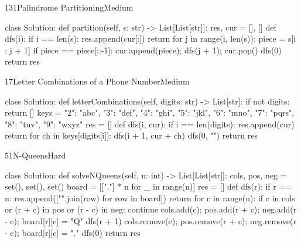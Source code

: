 \begin{problem}{131}{Palindrome Partitioning}{Medium}
\begin{code}
class Solution:
    def partition(self, s: str) -> List[List[str]]:
        res, cur = [], []
        def dfs(i):
            if i == len(s):
                res.append(cur[:])
                return
            for j in range(i, len(s)):
                piece = s[i : j + 1]
                if piece == piece[::-1]:
                    cur.append(piece); dfs(j + 1); cur.pop()
        dfs(0)
        return res
\end{code}
\end{problem}

\begin{problem}{17}{Letter Combinations of a Phone Number}{Medium}
\begin{code}
class Solution:
    def letterCombinations(self, digits: str) -> List[str]:
        if not digits:
            return []
        keys = {"2": "abc", "3": "def", "4": "ghi", "5": "jkl",
                "6": "mno", "7": "pqrs", "8": "tuv", "9": "wxyz"}
        res = []
        def dfs(i, cur):
            if i == len(digits):
                res.append(cur)
                return
            for ch in keys[digits[i]]:
                dfs(i + 1, cur + ch)
        dfs(0, "")
        return res
\end{code}
\end{problem}

\begin{problem}{51}{N-Queens}{Hard}
\begin{code}
class Solution:
    def solveNQueens(self, n: int) -> List[List[str]]:
        cols, pos, neg = set(), set(), set()
        board = [["."] * n for _ in range(n)]
        res = []
        def dfs(r):
            if r == n:
                res.append(["".join(row) for row in board])
                return
            for c in range(n):
                if c in cols or (r + c) in pos or (r - c) in neg:
                    continue
                cols.add(c); pos.add(r + c); neg.add(r - c); board[r][c] = "Q"
                dfs(r + 1)
                cols.remove(c); pos.remove(r + c); neg.remove(r - c); board[r][c] = "."
        dfs(0)
        return res
\end{code}
\end{problem}
